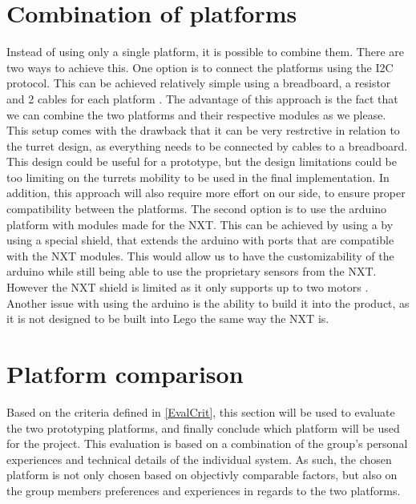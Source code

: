 \section{Combination of platforms}\label{CombPlat}
Instead of using only a single platform, it is possible to combine them. There
are two ways to achieve this. One option is to connect the platforms using the
I2C protocol. This can be achieved relatively simple using a breadboard, a
resistor and 2 cables for each platform \citep{ArduinoNXT}. The advantage of
this approach is the fact that we can combine the two platforms and their
respective modules as we please. This setup comes with the drawback that it can
be very restrctive in relation to the turret design, as everything needs to be
connected by cables to a breadboard. This design could be useful for a
prototype, but the design limitations could be too limiting on the turrets
mobility to be used in the final implementation. In addition, this approach will
also require more effort on our side, to ensure proper compatibility between the
platforms. The second option is to use the arduino platform with modules made
for the NXT. This can be achieved by using a by using a special shield, that
extends the arduino with ports that are compatible with the NXT modules. This
would allow us to have the customizability of the arduino while still being able
to use the proprietary sensors from the NXT. However the NXT shield is limited
as it only supports up to two motors \citep{NXTShield}. Another issue with using
the arduino is the ability to build it into the product, as it is not designed
to be built into Lego the same way the NXT is.\nl

\section{Platform comparison}
Based on the criteria defined in \autoref{EvalCrit}, this section will be used
to evaluate the two prototyping platforms, and finally conclude which platform
will be used for the \name project. This evaluation is based on a combination of
the group's personal experiences and technical details of the individual system.
As such, the chosen platform is not only chosen based on objectivly comparable
factors, but also on the group members preferences and experiences in regards to
the two platforms.


